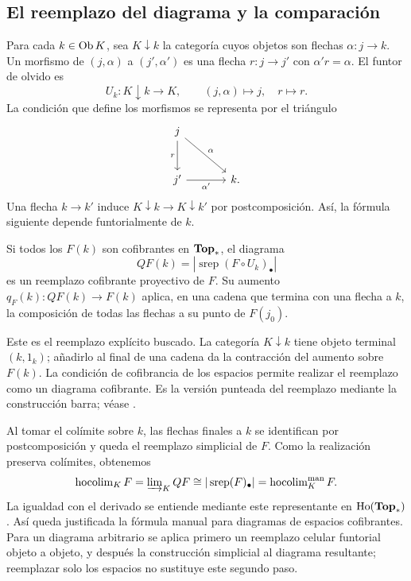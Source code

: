 \subsection{El reemplazo del diagrama y la comparación}

Para cada $k\in\operatorname{Ob} K$, sea $K\downarrow k$ la categoría cuyos objetos son flechas $\alpha\colon j\to k$. Un morfismo de $(j,\alpha)$ a $(j',\alpha')$ es una flecha $r\colon j\to j'$ con $\alpha'r=\alpha$. El funtor de olvido es
\[
U_k\colon K\downarrow k\longrightarrow K,\qquad
(j,\alpha)\longmapsto j,\quad r\longmapsto r.
\]
La condición que define los morfismos se representa por el triángulo
\[
\begin{tikzcd}[column sep=large,row sep=large]
j \arrow[d,"r"'] \arrow[dr,"\alpha"] &\\
j' \arrow[r,"\alpha'"'] & k.
\end{tikzcd}
\]
Una flecha $k\to k'$ induce $K\downarrow k\to K\downarrow k'$ por postcomposición. Así, la fórmula siguiente depende funtorialmente de $k$.

\begin{prop}\label{prop:c15-reemplazo-simplicial}
Si todos los $F(k)$ son cofibrantes en $\mathbf{Top}_*$, el diagrama
\[
QF(k)=|\operatorname{srep}(F\circ U_k)_\bullet|
\]
es un reemplazo cofibrante proyectivo de $F$. Su aumento $q_F(k)\colon QF(k)\to F(k)$ aplica, en una cadena que termina con una flecha a $k$, la composición de todas las flechas a su punto de $F(j_0)$.
\end{prop}

Este es el reemplazo explícito buscado. La categoría $K\downarrow k$ tiene objeto terminal $(k,1_k)$; añadirlo al final de una cadena da la contracción del aumento sobre $F(k)$. La condición de cofibrancia de los espacios permite realizar el reemplazo como un diagrama cofibrante. Es la versión punteada del reemplazo mediante la construcción barra; véase \cite[Secciones~\mbox{7.4.3--7.4.5}]{malkiewich}.

Al tomar el colímite sobre $k$, las flechas finales a $k$ se identifican por postcomposición y queda el reemplazo simplicial de $F$. Como la realización preserva colímites, obtenemos
\[
\operatorname{hocolim}_KF
=\varinjlim\nolimits_KQF
\cong|\operatorname{srep}(F)_\bullet|
=\operatorname{hocolim}^{\mathrm{man}}_KF.
\]
La igualdad con el derivado se entiende mediante este representante en $\operatorname{Ho}(\mathbf{Top}_*)$. Así queda justificada la fórmula manual para diagramas de espacios cofibrantes. Para un diagrama arbitrario se aplica primero un reemplazo celular funtorial objeto a objeto, y después la construcción simplicial al diagrama resultante; reemplazar solo los espacios no sustituye este segundo paso.


